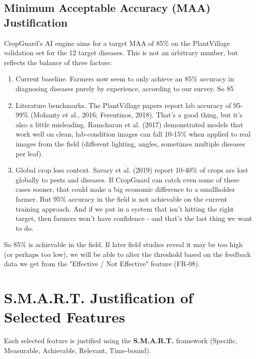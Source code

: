 \documentclass[12pt,a4paper]{article}
\begin{document}
\subsection{Minimum Acceptable Accuracy (MAA) Justification}
\label{sec:maa}

CropGuard's AI engine aims for a target MAA of 85\% on the PlantVillage validation set for the 12 target diseases. This is not an arbitrary number, but reflects the balance of three factors:

\begin{enumerate}[leftmargin=2em]
  \item Current baseline. Farmers now seem to only achieve an 85\% accuracy in diagnosing diseases purely by experience, according to our survey. So 85%

  \item Literature benchmarks. The PlantVillage papers report lab accuracy of 95-99\% (Mohanty et al., 2016; Ferentinos, 2018). That's a good thing, but it's also a little misleading. Ramcharan et al. (2017) demonstrated models that work well on clean, lab-condition images can fall 10-15\% when applied to real images from the field (different lighting, angles, sometimes multiple diseases per leaf).

  \item Global crop loss context. Savary et al. (2019) report 10-40\% of crops are lost globally to pests and diseases. If CropGuard can catch even some of these cases sooner, that could make a big economic difference to a smallholder farmer. But 95\% accuracy in the field is not achievable on the current training approach. And if we put in a system that isn't hitting the right target, then farmers won't have confidence - and that's the last thing we want to do.
\end{enumerate}

So 85\% is achievable in the field. If later field studies reveal it may be too high (or perhaps too low), we will be able to alter the threshold based on the feedback data we get from the "Effective / Not Effective" feature (FR-08).

\section{S.M.A.R.T. Justification of Selected Features}

Each selected feature is justified using the \textbf{S.M.A.R.T.} framework (Specific, Measurable, Achievable, Relevant, Time-bound).
\end{document}
